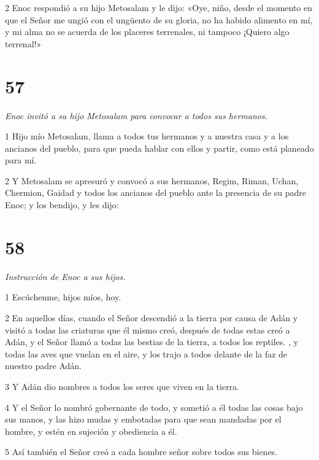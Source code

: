 \par 2 Enoc respondió a su hijo Metosalam y le dijo: «Oye, niño, desde el momento en que el Señor me ungió con el ungüento de su gloria, no ha habido alimento en mí, y mi alma no se acuerda de los placeres terrenales, ni tampoco ¡Quiero algo terrenal!»

\chapter{57}

\par \textit{Enoc invitó a su hijo Metosalam para convocar a todos sus hermanos.}

\par 1 Hijo mío Metosalam, llama a todos tus hermanos y a nuestra casa y a los ancianos del pueblo, para que pueda hablar con ellos y partir, como está planeado para mí.

\par 2 Y Metosalam se apresuró y convocó a sus hermanos, Regim, Riman, Uchan, Chermion, Gaidad y todos los ancianos del pueblo ante la presencia de su padre Enoc; y los bendijo, y les dijo:

\chapter{58}

\par \textit{Instrucción de Enoc a sus hijos.}

\par 1 Escúchenme, hijos míos, hoy.

\par 2 En aquellos días, cuando el Señor descendió a la tierra por causa de Adán y visitó a todas las criaturas que él mismo creó, después de todas estas creó a Adán, y el Señor llamó a todas las bestias de la tierra, a todos los reptiles. , y todas las aves que vuelan en el aire, y los trajo a todos delante de la faz de nuestro padre Adán.

\par 3 Y Adán dio nombres a todos los seres que viven en la tierra.

\par 4 Y el Señor lo nombró gobernante de todo, y sometió a él todas las cosas bajo sus manos, y las hizo mudas y embotadas para que sean mandadas por el hombre, y estén en sujeción y obediencia a él.

\par 5 Así también el Señor creó a cada hombre señor sobre todos sus bienes.


